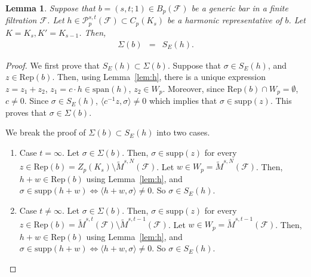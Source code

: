 \documentclass[11pt]{amsart}
\theoremstyle{theorem}
\newtheorem{lemma}{Lemma}[section]
\theoremstyle{remark}
\theoremstyle{definition}
\newcommand{\HH}  {\mbox{\rm H}}
\newcommand{\supp}{\mathrm{supp}}
\newcommand{\Rep}{\mathrm{Rep}}
\begin{document}
\begin{lemma}
\label{lem:simplified}
    Suppose that $b=(s,t;1) \in B_p(\mathcal{F})$ be a generic bar in a finite filtration $\mathcal{F}$. 
    Let $h \in \mathcal{P}^{s,t}_p(\mathcal{F}) \subset C_p(K_s)$ be a harmonic representative of $b$.  Let $K = K_s, K' = K_{s-1}$.
    Then, 
    \begin{eqnarray*}
        \Sigma(b) &=& S_E(h).
    \end{eqnarray*}
\end{lemma}
\begin{proof}

We first prove that $S_E(h) \subset \Sigma(b)$. Suppose that $\sigma \in S_E(h)$, and $z \in \Rep(b)$. Then, using Lemma~\ref{lem:h}, there is a unique expression 
$z = z_1 + z_2$, $z_1 = c\cdot h\in \mathrm{span}(h)$, $z_2 \in W_p$.
Moreover, since $\Rep(b) \cap W_p = \emptyset$, $c \neq 0$.
Since $\sigma \in S_E(h)$, $\langle c^{-1} z, \sigma\rangle \neq 0$ which implies that $\sigma \in \supp(z)$. This proves that $\sigma \in \Sigma(b)$.
    
We break the proof of $\Sigma(b) \subset  S_E(h)$ into two cases.
\begin{enumerate}
\item Case $t = \infty$.
Let $\sigma\in \Sigma(b)$. Then,
    $\sigma \in \supp(z)$ for every $z \in \Rep(b) = Z_p(K_s) \setminus \widetilde{M}^{s,N}(\mathcal{F})$. Let $w \in W_p = \widetilde{M}^{s,N}(\mathcal{F})$. Then, $h + w \in \Rep(b)$ using Lemma~\ref{lem:h}, and 
    $\sigma \in \supp(h+w) \Leftrightarrow \langle h+w,\sigma\rangle \neq 0$.
    So $\sigma \in S_E(h)$.

\item Case $t \neq \infty$. Let $\sigma\in \Sigma(b)$. Then,
    $\sigma \in \supp(z)$ for every $z \in \Rep(b) = \widetilde{M}^{s,t}(\mathcal{F}) \setminus \widetilde{M}^{s,t-1}(\mathcal{F})$. Let $w \in W_p = \widetilde{M}^{s,t-1}(\mathcal{F})$. Then, $h + w \in \Rep(b)$ using Lemma~\ref{lem:h}, and 
    $\sigma \in \supp(h+w) \Leftrightarrow \langle h+w,\sigma\rangle \neq 0$.
    So $\sigma \in S_E(h)$.
\end{enumerate}
\end{proof}
\end{document}

